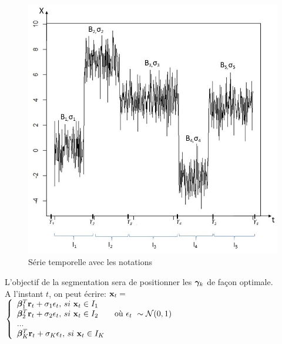 \documentclass[12pt]{article}
\begin{document}
\begin{figure}[H] 
\centering
\includegraphics[scale=.5]{SchemaSerieTemp.JPG}
\caption{\label{fig: tempseries2} Série temporelle avec les notations}
\end{figure} 
%
L'objectif de la segmentation sera de positionner les $\boldsymbol{\gamma}_{k}$ de façon optimale.\\


A l'instant $t$, on peut écrire:
${\mathbf{x}}_{t}=$
 $\left \{
   \begin{array}{l}
     \boldsymbol{\beta}_{1}^T \mathbf{r}_{t} + \sigma_{1}\epsilon_{t}, \, si\  {\mathbf{x}}_{t}\in I_{1}\\
     \boldsymbol{\beta}_{2}^T \mathbf{r}_{t} + \sigma_{2}\epsilon_{t}, \, si\  {\mathbf{x}}_{t}\in I_{2} \qquad \textrm{où}\ \epsilon_{t}\ \sim \mathcal{N}(0,1)\, \\
     ...\\
     \boldsymbol{\beta}_{K}^T \mathbf{r}_{t} + \sigma_{K}\epsilon_{t}, \, si\  {\mathbf{x}}_{t}\in I_{K}\\
       \end{array}
   \right. $
\smallbreak
\end{document}
